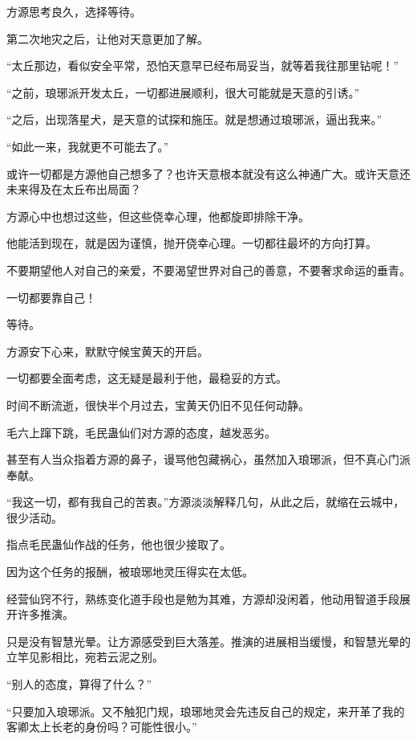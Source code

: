 
\begin{this_body}

方源思考良久，选择等待。

第二次地灾之后，让他对天意更加了解。

“太丘那边，看似安全平常，恐怕天意早已经布局妥当，就等着我往那里钻呢！”

“之前，琅琊派开发太丘，一切都进展顺利，很大可能就是天意的引诱。”

“之后，出现落星犬，是天意的试探和施压。就是想通过琅琊派，逼出我来。”

“如此一来，我就更不可能去了。”

或许一切都是方源他自己想多了？也许天意根本就没有这么神通广大。或许天意还未来得及在太丘布出局面？

方源心中也想过这些，但这些侥幸心理，他都旋即排除干净。

他能活到现在，就是因为谨慎，抛开侥幸心理。一切都往最坏的方向打算。

不要期望他人对自己的亲爱，不要渴望世界对自己的善意，不要奢求命运的垂青。

一切都要靠自己！

等待。

方源安下心来，默默守候宝黄天的开启。

一切都要全面考虑，这无疑是最利于他，最稳妥的方式。

时间不断流逝，很快半个月过去，宝黄天仍旧不见任何动静。

毛六上蹿下跳，毛民蛊仙们对方源的态度，越发恶劣。

甚至有人当众指着方源的鼻子，谩骂他包藏祸心，虽然加入琅琊派，但不真心门派奉献。

“我这一切，都有我自己的苦衷。”方源淡淡解释几句，从此之后，就缩在云城中，很少活动。

指点毛民蛊仙作战的任务，他也很少接取了。

因为这个任务的报酬，被琅琊地灵压得实在太低。

经营仙窍不行，熟练变化道手段也是勉为其难，方源却没闲着，他动用智道手段展开许多推演。

只是没有智慧光晕。让方源感受到巨大落差。推演的进展相当缓慢，和智慧光晕的立竿见影相比，宛若云泥之别。

“别人的态度，算得了什么？”

“只要加入琅琊派。又不触犯门规，琅琊地灵会先违反自己的规定，来开革了我的客卿太上长老的身份吗？可能性很小。”


\end{this_body}
